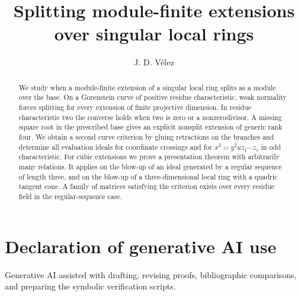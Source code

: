 \documentclass[11pt,reqno]{amsart}
\title[Module-finite extensions over singular local rings]{Splitting module-finite extensions over singular local rings}
\author{J. D. V\'elez}
\date{}
\theoremstyle{definition}
\theoremstyle{remark}
\theoremstyle{plain}
\begin{document}
\begin{abstract}
We study when a module-finite extension of a singular local ring splits as a module over the base. On a Gorenstein curve of positive residue characteristic, weak normality forces splitting for every extension of finite projective dimension. In residue characteristic two the converse holds when two is zero or a nonzerodivisor. A missing square root in the prescribed base gives an explicit nonsplit extension of generic rank four. We obtain a second curve criterion by gluing retractions on the branches and determine all evaluation ideals for coordinate crossings and for $x^2=y^2u z_1\cdots z_s$ in odd characteristic. For cubic extensions we prove a presentation theorem with arbitrarily many relations. It applies on the blow-up of an ideal generated by a regular sequence of length three, and on the blow-up of a three-dimensional local ring with a quadric tangent cone. A family of matrices satisfying the criterion exists over every residue field in the regular-sequence case.
\end{abstract}
\maketitle












\section*{Declaration of generative AI use}
Generative AI assisted with drafting, revising proofs, bibliographic comparisons, and preparing the symbolic verification scripts.

\end{document}
